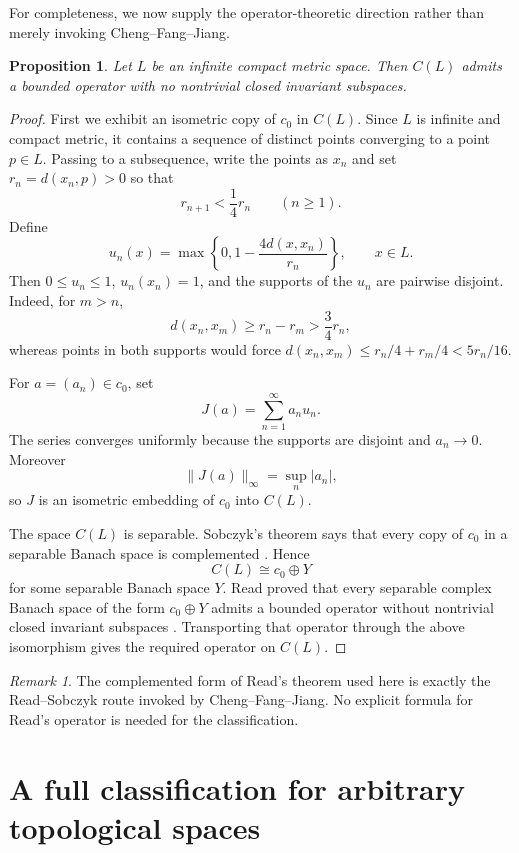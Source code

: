 \documentclass[11pt]{article}
\newtheorem{proposition}[theorem]{Proposition}
\theoremstyle{remark}
\newtheorem{remark}[theorem]{Remark}
\begin{document}
For completeness, we now supply the operator-theoretic direction rather than
merely invoking Cheng--Fang--Jiang.

\begin{proposition}\label{prop:compact-existence}
Let $L$ be an infinite compact metric space.  Then $C(L)$ admits a bounded
operator with no nontrivial closed invariant subspaces.
\end{proposition}

\begin{proof}
First we exhibit an isometric copy of $c_0$ in $C(L)$.  Since $L$ is infinite
and compact metric, it contains a sequence of distinct points converging to a
point $p\in L$.  Passing to a subsequence, write the points as $x_n$ and set
$r_n=d(x_n,p)>0$ so that
\[
  r_{n+1}<\frac14 r_n\qquad(n\geq1).
\]
Define
\[
  u_n(x)=\max\left\{0,1-\frac{4d(x,x_n)}{r_n}\right\},\qquad x\in L.
\]
Then $0\leq u_n\leq1$, $u_n(x_n)=1$, and the supports of the $u_n$ are
pairwise disjoint.  Indeed, for $m>n$,
\[
  d(x_n,x_m)\geq r_n-r_m>\frac34r_n,
\]
whereas points in both supports would force
$d(x_n,x_m)\leq r_n/4+r_m/4<5r_n/16$.

For $a=(a_n)\in c_0$, set
\[
  J(a)=\sum_{n=1}^{\infty}a_nu_n.
\]
The series converges uniformly because the supports are disjoint and
$a_n\to0$.  Moreover
\[
  \lVert J(a)\rVert_\infty=\sup_n|a_n|,
\]
so $J$ is an isometric embedding of $c_0$ into $C(L)$.

The space $C(L)$ is separable.  Sobczyk's theorem says that every copy of
$c_0$ in a separable Banach space is complemented \cite{Sobczyk}.  Hence
\[
  C(L)\cong c_0\oplus Y
\]
for some separable Banach space $Y$.  Read proved that every separable complex
Banach space of the form $c_0\oplus Y$ admits a bounded operator without
nontrivial closed invariant subspaces \cite{Read}.  Transporting that operator
through the above isomorphism gives the required operator on $C(L)$.
\end{proof}

\begin{remark}
The complemented form of Read's theorem used here is exactly the
Read--Sobczyk route invoked by Cheng--Fang--Jiang.  No explicit formula for
Read's operator is needed for the classification.
\end{remark}

\section{A full classification for arbitrary topological spaces}
\label{sec:classification}
\end{document}
